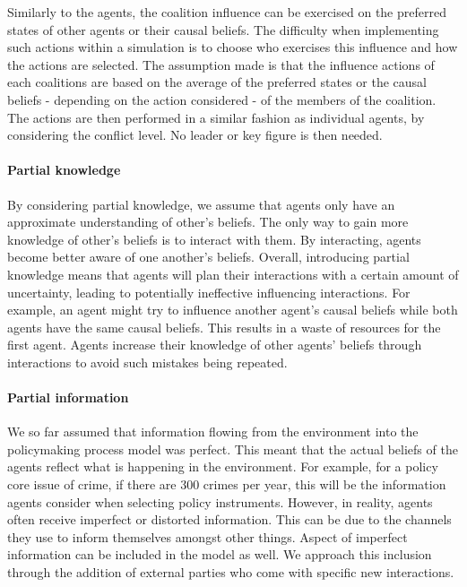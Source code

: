 \documentclass[11pt]{article}
\begin{document}
Similarly to the agents, the coalition influence can be exercised on the preferred states of other agents or their causal beliefs. The difficulty when implementing such actions within a simulation is to choose who exercises this influence and how the actions are selected. The assumption made is that the influence actions of each coalitions are based on the average of the preferred states or the causal beliefs - depending on the action considered - of the members of the coalition. The actions are then performed in a similar fashion as individual agents, by considering the conflict level. No leader or key figure is then needed.

\paragraph{Partial knowledge}

By considering partial knowledge, we assume that agents only have an approximate understanding of other's beliefs. The only way to gain more knowledge of other's beliefs is to interact with them. By interacting, agents become better aware of one another's beliefs. Overall, introducing partial knowledge means that agents will plan their interactions with a certain amount of uncertainty, leading to potentially ineffective influencing interactions. For example, an agent might try to influence another agent's causal beliefs while both agents have the same causal beliefs. This results in a waste of resources for the first agent. Agents increase their knowledge of other agents' beliefs through interactions to avoid such mistakes being repeated.

\paragraph{Partial information}

We so far assumed that information flowing from the environment into the policymaking process model was perfect. This meant that the actual beliefs of the agents reflect what is happening in the environment. For example, for a policy core issue of crime, if there are 300 crimes per year, this will be the information agents consider when selecting policy instruments. However, in reality, agents often receive imperfect or distorted information. This can be due to the channels they use to inform themselves amongst other things. Aspect of imperfect information can be included in the model as well. We approach this inclusion through the addition of external parties who come with specific new interactions.
\end{document}
